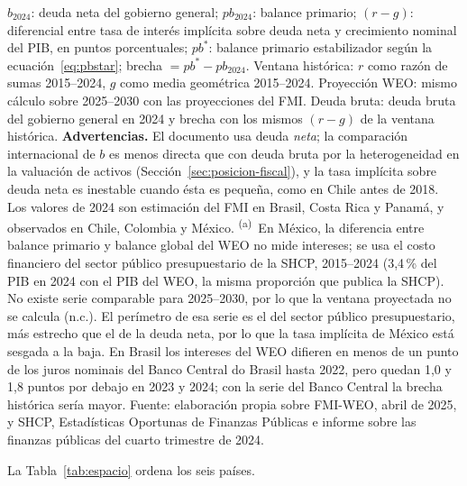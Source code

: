 \documentclass[12pt, letterpaper]{article}
\begin{document}
\begin{table}[htbp]
  \centering
  \caption{Brecha de balance primario estabilizador de deuda, 2024 (\% del PIB;
  ordenada por brecha con ventana histórica).}
  \label{tab:espacio}
  \small
  \setlength{\tabcolsep}{4pt}
  

  \vspace{2pt}
  \footnotesize
  $b_{2024}$: deuda neta del gobierno general; $pb_{2024}$: balance primario;
  $(r-g)$: diferencial entre tasa de interés implícita sobre deuda neta y
  crecimiento nominal del PIB, en puntos porcentuales; $pb^{*}$: balance primario
  estabilizador según la ecuación~\eqref{eq:pbstar}; brecha $= pb^{*} - pb_{2024}$.
  Ventana histórica: $r$ como razón de sumas 2015--2024, $g$ como media geométrica
  2015--2024. Proyección WEO: mismo cálculo sobre 2025--2030 con las proyecciones
  del FMI. Deuda bruta: deuda bruta del gobierno general en 2024 y brecha con los
  mismos $(r-g)$ de la ventana histórica. \textbf{Advertencias.} El documento usa deuda \emph{neta}; la comparación
  internacional de $b$ es menos directa que con deuda bruta por la heterogeneidad
  en la valuación de activos (Sección~\ref{sec:posicion-fiscal}), y la tasa
  implícita sobre deuda neta es inestable cuando ésta es pequeña, como en Chile
  antes de 2018. Los valores de 2024 son estimación del FMI en Brasil, Costa Rica y
  Panamá, y observados en Chile, Colombia y México.
  \textsuperscript{(a)}~En México, la diferencia entre balance primario y balance
  global del WEO no mide intereses; se usa el costo financiero del sector público
  presupuestario de la SHCP, 2015--2024 (3,4\,\% del PIB en 2024 con el PIB del WEO,
  la misma proporción que publica la SHCP). No existe serie
  comparable para 2025--2030, por lo que la ventana proyectada no se calcula (n.c.).
  El perímetro de esa serie es el del sector público presupuestario, más estrecho
  que el de la deuda neta, por lo que la tasa implícita de México está sesgada a la
  baja. En Brasil
  los intereses del WEO difieren en menos de un punto de los juros nominais del
  Banco Central do Brasil hasta 2022, pero quedan 1,0 y 1,8 puntos por debajo en
  2023 y 2024; con la serie del Banco Central la brecha histórica sería mayor.
  Fuente: elaboración propia sobre FMI-WEO, abril de 2025, y SHCP, Estadísticas
  Oportunas de Finanzas Públicas e informe sobre las finanzas públicas del cuarto
  trimestre de 2024.
\end{table}

La Tabla~\ref{tab:espacio} ordena los seis países.
\end{document}
